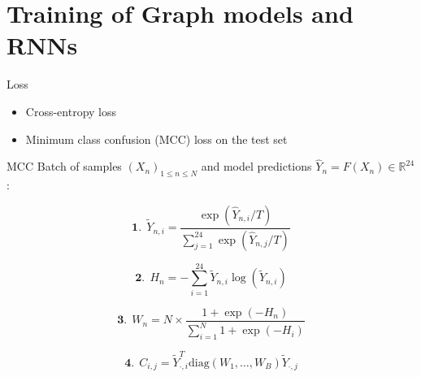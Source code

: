 \documentclass{beamer}
\newcommand{\R}{\mathbb{R}}
\begin{document}
\section{Training of Graph models and RNNs}

\begin{frame}{Loss}
    \begin{itemize}
        \item Cross-entropy loss
        \item Minimum class confusion (MCC) loss on the test set
    \end{itemize}

    \begin{block}{MCC}
        Batch of samples $(X_n)_{1\leq n\leq N}$ and model predictions $\hat{Y}_n = F(X_n)\in\R^{24}$ :

        \begin{minipage}{.5\linewidth}
            \begin{equation*}
                \textbf{1.}\:\: \tilde{Y}_{n,i} = \frac{\exp\left(\hat{Y}_{n,i}/T\right)}{\sum_{j=1}^{24}\exp\left(\hat{Y}_{n,j}/T\right)}
            \end{equation*}
            \vspace*{\fill}
        \end{minipage}
        \begin{minipage}{.5\linewidth}
            \begin{equation*}
                \textbf{2.}\:\: H_n = -\sum_{i=1}^{24}\tilde{Y}_{n,i}\log\left(\tilde{Y}_{n,i}\right)
            \end{equation*}
            \vspace*{\fill}
        \end{minipage}
        \begin{minipage}{.5\linewidth}
            \begin{equation*}
                \textbf{3.}\:\: W_n = N\times\frac{1+\exp(-H_n)}{\sum_{i=1}^{N} 1+\exp(-H_i)}
            \end{equation*}
            \vspace*{\fill}
        \end{minipage}
        \begin{minipage}{.5\linewidth}
            \begin{equation*}
                \textbf{4.}\:\: C_{i,j} = \tilde{Y}_{\cdot,i}^T \text{diag}(W_1,\dots,W_B) \tilde{Y}_{\cdot,j}
            \end{equation*}
            \vspace*{\fill}
        \end{minipage}
    \end{block}
\end{frame}
\end{document}
